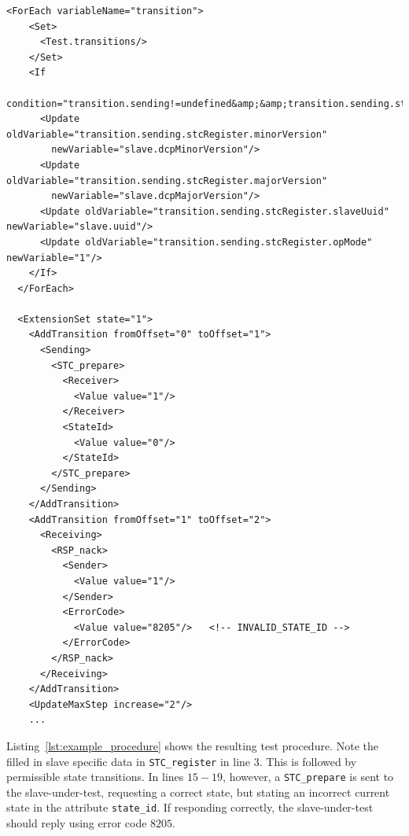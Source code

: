 \documentclass[a4paper]{scrartcl}
\theoremstyle{definition}
\begin{document}
\lstset{language=xml, numbers=left, numberstyle=\tiny, numbersep=10pt, frame=lines, captionpos=t, aboveskip=10pt, belowskip=10pt}
\begin{lstlisting}[caption=Snippet of an extension, label=lst:example_extension]
  <ForEach variableName="transition">
    <Set>
      <Test.transitions/>
    </Set>
    <If
      condition="transition.sending!=undefined&amp;&amp;transition.sending.stcRegister!=undefined">
      <Update oldVariable="transition.sending.stcRegister.minorVersion"
        newVariable="slave.dcpMinorVersion"/>
      <Update oldVariable="transition.sending.stcRegister.majorVersion"
        newVariable="slave.dcpMajorVersion"/>
      <Update oldVariable="transition.sending.stcRegister.slaveUuid" newVariable="slave.uuid"/>
      <Update oldVariable="transition.sending.stcRegister.opMode" newVariable="1"/>
    </If>
  </ForEach>

  <ExtensionSet state="1">
    <AddTransition fromOffset="0" toOffset="1">
      <Sending>
        <STC_prepare>
          <Receiver>
            <Value value="1"/>
          </Receiver>
          <StateId>
            <Value value="0"/>
          </StateId>
        </STC_prepare>
      </Sending>
    </AddTransition>
    <AddTransition fromOffset="1" toOffset="2">
      <Receiving>
        <RSP_nack>
          <Sender>
            <Value value="1"/>
          </Sender>
          <ErrorCode>
            <Value value="8205"/>   <!-- INVALID_STATE_ID -->
          </ErrorCode>
        </RSP_nack>
      </Receiving>
    </AddTransition>
    <UpdateMaxStep increase="2"/>
    ...
\end{lstlisting}

Listing~\ref{lst:example_procedure} shows the resulting test procedure.
Note the filled in slave specific data in  \texttt{STC\_register} in  line $3$.
This is followed by permissible state transitions.
In lines $15-19$, however, a  \texttt{STC\_prepare} is sent to the slave-under-test, requesting a correct state, but stating an incorrect current state in the attribute \texttt{state\_id}.
If responding correctly, the slave-under-test should reply using error code $8205$.
\end{document}
